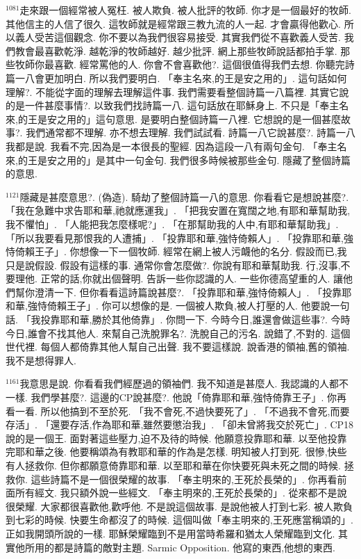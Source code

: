 \documentclass{book}
\begin{document}
$^{1081}$走來跟一個經常被人冤枉.
被人欺負.
被人批評的牧師.
你才是一個最好的牧師.
其他信主的人信了很久.
這牧師就是經常跟三教九流的人一起.
才會贏得他歡心.
所以義人受苦這個觀念.
你不要以為我們很容易接受.
其實我們從不喜歡義人受苦.
我們教會最喜歡乾淨.
越乾淨的牧師越好.
越少批評.
網上那些牧師說話都拍手掌.
那些牧師你最喜歡.
經常罵他的人.
你會不會喜歡他?.
這個很值得我們去想.
你聽完詩篇一八會更加明白.
所以我們要明白.
「奉主名來,的王是安之用的」.
這句話如何理解?.
不能從字面的理解去理解這件事.
我們需要看整個詩篇一八篇裡.
其實它說的是一件甚麼事情?.
以致我們找詩篇一八.
這句話放在耶穌身上.
不只是「奉主名來,的王是安之用的」這句意思.
是要明白整個詩篇一八裡.
它想說的是一個甚麼故事?.
我們通常都不理解.
亦不想去理解.
我們試試看.
詩篇一八它說甚麼?.
詩篇一八我都是說.
我看不完,因為是一本很長的聖經.
因為這段一八有兩句金句.
「奉主名來,的王是安之用的」是其中一句金句.
我們很多時候被那些金句.
隱藏了整個詩篇的意思.

$^{1121}$隱藏是甚麼意思?.
(偽造).
騎劫了整個詩篇一八的意思.
你看看它是想說甚麼?.
「我在急難中求告耶和華,祂就應運我」.
「把我安置在寬闊之地,有耶和華幫助我,我不懼怕」.
「人能把我怎麼樣呢?」.
「在那幫助我的人中,有耶和華幫助我」.
「所以我要看見那恨我的人遭捕」.
「投靠耶和華,強恃倚賴人」.
「投靠耶和華,強恃倚賴王子」.
你想像一下一個牧師.
經常在網上被人污衊他的名分.
假設而已,我只是說假設.
假設有這樣的事.
通常你會怎麼做?.
你說有耶和華幫助我.
行,沒事,不要理他.
正常的話,你就出個聲明.
告訴一些你認識的人.
一些你德高望重的人.
讓他們幫你澄清一下.
但你看看這詩篇說甚麼?.
「投靠耶和華,強恃倚賴人」.
「投靠耶和華,強恃倚賴王子」.
你可以想像的是.
一個被人欺負,被人打壓的人.
他要說一句話.
「我投靠耶和華,勝於其他倚靠」.
你問一下.
今時今日,誰還會做這些事?.
今時今日,誰會不找其他人.
來幫自己洗脫罪名?.
洗脫自己的污名.
說錯了,不對的.
這個世代裡.
每個人都倚靠其他人幫自己出聲.
我不要這樣說.
說香港的領袖,舊的領袖.
我不是想得罪人.

$^{1161}$我意思是說.
你看看我們經歷過的領袖們.
我不知道是甚麼人.
我認識的人都不一樣.
我們學甚麼?.
這邊的CP說甚麼?.
他說「倚靠耶和華,強恃倚靠王子」.
你再看一看.
所以他搞到不至於死.
「我不會死,不過快要死了」.
「不過我不會死,而要存活」.
「還要存活,作為耶和華,雖然要懲治我」.
「卻未曾將我交於死亡」.
CP18說的是一個王.
面對著這些壓力,迫不及待的時候.
他願意投靠耶和華.
以至他投靠完耶和華之後.
他要稱頌為有教耶和華的作為是怎樣.
明知被人打到死.
很慘,快些有人拯救你.
但你都願意倚靠耶和華.
以至耶和華在你快要死與未死之間的時候.
拯救你.
這些詩篇不是一個很榮耀的故事.
「奉主明來的,王死於長榮的」.
你再看前面所有經文.
我只額外說一些經文.
「奉主明來的,王死於長榮的」.
從來都不是說很榮耀.
大家都很喜歡他,歡呼他.
不是說這個故事.
是說他被人打到七彩.
被人欺負到七彩的時候.
快要生命都沒了的時候.
這個叫做「奉主明來的,王死應當稱頌的」.
正如我開頭所說的一樣.
耶穌榮耀臨到不是用當時希羅和猶太人榮耀臨到文化.
其實他所用的都是詩篇的敵對主題.
Sarmic Opposition.
他寫的東西,他想的東西.
\end{document}
